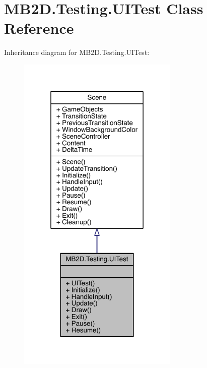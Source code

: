 \hypertarget{class_m_b2_d_1_1_testing_1_1_u_i_test}{}\section{M\+B2\+D.\+Testing.\+U\+I\+Test Class Reference}
\label{class_m_b2_d_1_1_testing_1_1_u_i_test}


Inheritance diagram for M\+B2\+D.\+Testing.\+U\+I\+Test\+:\nopagebreak
\begin{figure}[H]
\begin{center}
\leavevmode
\includegraphics[width=217pt]{class_m_b2_d_1_1_testing_1_1_u_i_test__inherit__graph}
\end{center}
\end{figure}


